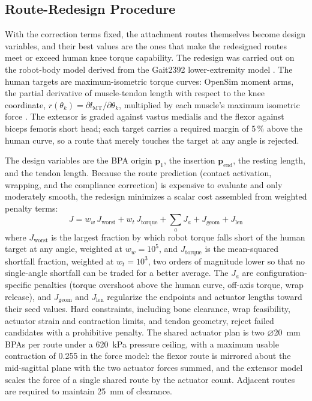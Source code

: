 \subsection{Route-Redesign Procedure}\label{sec:route_redesign}

With the correction terms fixed, the attachment routes themselves become design variables, and their best values are the ones that make the redesigned routes meet or exceed human knee torque capability. The redesign was carried out on the robot-body model derived from the Gait2392 lower-extremity model \citep{delp_opensim_2007,seth_opensim_2018}. The human targets are maximum-isometric torque curves: OpenSim moment arms, the partial derivative of muscle-tendon length with respect to the knee coordinate, $r(\theta_{k}) = \partial l_{\mathrm{MT}}/\partial\theta_{k}$, multiplied by each muscle's maximum isometric force \citep{delp_interactive_1990,hoy_musculoskeletal_1990,yamaguchi_planar_1989,sherman_what_2013,millard_flexing_2013,thelen_adjustment_2003,seth_opensim_2011}. The extensor is graded against vastus medialis and the flexor against biceps femoris short head; each target carries a required margin of 5\,\% above the human curve, so a route that merely touches the target at any angle is rejected.

The design variables are the BPA origin $\mathbf{p}_{1}$, the insertion $\mathbf{p}_{\mathrm{end}}$, the resting length, and the tendon length. Because the route prediction (contact activation, wrapping, and the compliance correction) is expensive to evaluate and only moderately smooth, the redesign minimizes a scalar cost assembled from weighted penalty terms:
\begin{equation}
    J = w_{w}\,J_{\text{worst}} + w_{t}\,J_{\text{torque}} + \textstyle\sum_{a} J_{a} + J_{\text{geom}} + J_{\text{len}}
    \label{eq:opt_cost}
\end{equation}
where $J_{\text{worst}}$ is the largest fraction by which robot torque falls short of the human target at any angle, weighted at $w_{w} = 10^{5}$, and $J_{\text{torque}}$ is the mean-squared shortfall fraction, weighted at $w_{t} = 10^{3}$, two orders of magnitude lower so that no single-angle shortfall can be traded for a better average. The $J_{a}$ are configuration-specific penalties (torque overshoot above the human curve, off-axis torque, wrap release), and $J_{\text{geom}}$ and $J_{\text{len}}$ regularize the endpoints and actuator lengths toward their seed values. Hard constraints, including bone clearance, wrap feasibility, actuator strain and contraction limits, and tendon geometry, reject failed candidates with a prohibitive penalty. The shared actuator plan is two $\diameter$\qty{20}{\mm} BPAs per route under a \qty{620}{\kPa} pressure ceiling, with a maximum usable contraction of 0.255 in the force model: the flexor route is mirrored about the mid-sagittal plane with the two actuator forces summed, and the extensor model scales the force of a single shared route by the actuator count. Adjacent routes are required to maintain \qty{25}{\mm} of clearance.

